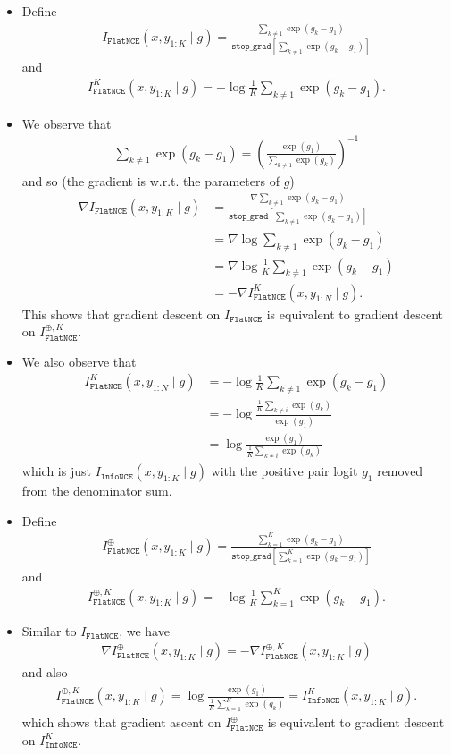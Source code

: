 \documentclass[10pt]{article}
\newcommand{\infonce}{\texttt{InfoNCE}}
\newcommand{\flatnce}{\texttt{FlatNCE}}
\newcommand{\stopg}{\texttt{stop\char`_grad}}
\begin{document}
\begin{itemize}
\item Define
\begin{align*}
I_\flatnce(x,y_{1:K} \mid g) = \frac{\sum_{k \neq 1} \exp(g_k - g_1)}{\stopg[\sum_{k \neq 1} \exp(g_k - g_1)]}
\end{align*}
and
\begin{align*}
I^K_\flatnce(x,y_{1:K} \mid g) = - \log \frac{1}{K} \sum_{k \neq 1} \exp(g_k - g_1).
\end{align*}
\item We observe that
\begin{align*}
\sum_{k \neq 1} \exp(g_k - g_1) = \left( \frac{\exp(g_1)}{\sum_{k \neq 1} \exp(g_k)} \right)^{-1}
\end{align*}
and so (the gradient is w.r.t. the parameters of $g$)
\begin{align*}
\nabla I_\flatnce(x,y_{1:K} \mid g) &= \frac{\nabla \sum_{k \neq 1} \exp(g_k - g_1)}{\stopg[\sum_{k \neq 1} \exp(g_k - g_1)]} \\
&= \nabla \log \sum_{k \neq 1} \exp(g_k - g_1) \\
&= \nabla \log \frac{1}{K} \sum_{k \neq 1} \exp(g_k - g_1) \\
&= - \nabla I^K_\flatnce(x,y_{1:N} \mid g).
\end{align*}
This shows that gradient descent on $I_\flatnce$ is equivalent to gradient descent on $I^{\oplus,K}_\flatnce$.
\item We also observe that
\begin{align*}
I^K_\flatnce(x,y_{1:N} \mid g) &= - \log \frac{1}{K} \sum_{k \neq 1} \exp(g_k - g_1) \\
&= - \log \frac{\frac{1}{K} \sum_{k \neq i} \exp(g_k)}{\exp(g_1)} \\
&= \log \frac{\exp(g_1)}{\frac{1}{K} \sum_{k \neq i} \exp(g_k)}
\end{align*}
which is just $I_\infonce(x,y_{1:K} \mid g)$ with the positive pair logit $g_1$ removed from the denominator sum.

\newpage

\item Define
\begin{align*}
I^\oplus_\flatnce(x,y_{1:K} \mid g) = \frac{\sum_{k = 1}^K \exp(g_k - g_1)}{\stopg[\sum_{k = 1}^K \exp(g_k - g_1)]}
\end{align*}
and
\begin{align*}
I^{\oplus,K}_\flatnce(x,y_{1:K} \mid g) = - \log \frac{1}{K} \sum_{k = 1}^K \exp(g_k - g_1).
\end{align*}
\item Similar to $I_\flatnce$, we have
\begin{align*}
\nabla I^\oplus_\flatnce(x,y_{1:K} \mid g) = - \nabla I^{\oplus,K}_\flatnce(x,y_{1:K} \mid g)
\end{align*}
and also
\begin{align*}
I^{\oplus,K}_\flatnce(x,y_{1:K} \mid g) = \log \frac{\exp(g_1)}{\frac{1}{K} \sum_{k = 1}^K \exp(g_k) } = I_\infonce^K(x,y_{1:K} \mid g).
\end{align*}
which shows that gradient ascent on $I^\oplus_\flatnce$ is equivalent to gradient descent on $I_\infonce^K$.
\end{itemize}
\end{document}
